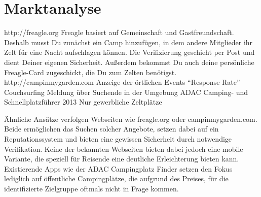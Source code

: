 
\section{Marktanalyse}
     http://freagle.org
    Freagle basiert auf Gemeinschaft und Gastfreundschaft. Deshalb musst Du zunächst ein Camp hinzufügen, in dem andere Mitglieder ihr Zelt für eine Nacht aufschlagen können.
      Die Verifizierung geschieht per Post und dient Deiner eigenen Sicherheit. Außerdem bekommst Du auch deine persönliche Freagle-Card zugeschickt, die Du zum Zelten benötigst.
     http://campinmygarden.com
      Anzeige der örtlichen Events
      “Response Rate”
      Couchsurfing
      Meldung über Suchende in der Umgebung
      ADAC Camping- und Schnellplatzführer 2013
      Nur gewerbliche Zeltplätze
       
      Ähnliche Ansätze verfolgen Webseiten wie freagle.org oder campinmygarden.com. Beide ermöglichen das Suchen solcher Angebote, setzen dabei auf ein Reputationssystem und bieten eine gewissen Sicherheit durch notwendige Verifikation. Keine der bekannten Webseiten bieten dabei jedoch eine mobile Variante, die speziell für Reisende eine deutliche Erleichterung bieten kann. Existierende Apps wie der ADAC Campingplatz Finder setzen den Fokus lediglich auf öffentliche Campingplätze, die aufgrund des Preises, für die identifizierte Zielgruppe oftmals nicht in Frage kommen.\\
